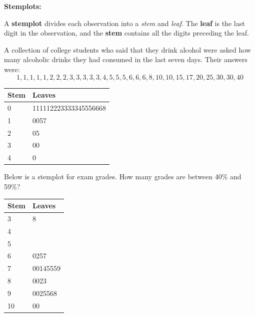 \documentclass[../mathNotesPreamble]{subfiles}
\begin{document}
  {\noindent\Large\textbf{Stemplots:}}
  \begin{defn*}
    A \textbf{stemplot} divides each observation into a \emph{stem} and \emph{leaf}. The \textbf{leaf} is the last digit in the observation, and the \textbf{stem} contains all the digits preceding the leaf.
  \end{defn*}
  \begin{ex*}
    A collection of college students who said that they drink alcohol were asked how many alcoholic drinks they had consumed in the last seven days. Their answers were:
    \[1, 1, 1, 1, 1, 2, 2, 2, 3, 3, 3, 3, 3, 4, 5, 5, 5, 6, 6, 6, 8, 10, 10, 15, 17, 20, 25, 30, 30, 40\]
  \end{ex*}
  \begin{center}
    \begin{tabular}{@{}ll@{}}\toprule
      Stem& Leaves\\\midrule
      0& 111112223333345556668\\
      1& 0057\\
      2& 05\\
      3& 00\\
      4& 0\\\bottomrule
    \end{tabular}
  \end{center}
  
  \begin{ex*}
    Below is a stemplot for exam grades. How many grades are between 40\% and 59\%?
  \end{ex*}
  \begin{center}
    \begin{tabular}{@{}ll@{}}\toprule
      Stem& Leaves\\\midrule
      3& 8\\
      4& \\
      5& \\
      6& 0257\\
      7& 00145559\\
      8& 0023\\
      9& 0025568\\
      10& 00\\\bottomrule
    \end{tabular}
  \end{center}

  \pagebreak
\end{document}
